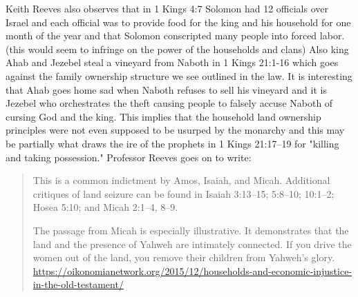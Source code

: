 \documentclass[11pt]{article}
\begin{document}
{Keith Reeves also observes that in 1 Kings 4:7 Solomon had 12 officials over Israel and each official was to provide food for the king and his household for one month of the year and that Solomon conscripted many people into forced labor. (this would seem to infringe on the power of the households and clans) Also king Ahab and Jezebel steal a vineyard from Naboth in 1 Kings 21:1-16 which goes against the family ownership structure we see outlined in the law. It is interesting that Ahab goes home sad when Naboth refuses to sell his vineyard and it is Jezebel who orchestrates the theft causing people to falsely accuse Naboth of cursing God and the king. This implies that the household land ownership principles were not even supposed to be usurped by the monarchy and this may be partially what draws the ire of the prophets in 1 Kings 21:17–19 for "killing and taking possession." Professor Reeves goes on to write:
\begin{quote}
This is a common indictment by Amos, Isaiah, and Micah. Additional critiques of land seizure can be found in Isaiah 3:13–15; 5:8–10; 10:1–2; Hosea 5:10; and Micah 2:1–4, 8–9.

The passage from Micah is especially illustrative. It demonstrates that the land and the presence of Yahweh are intimately connected. If you drive the women out of the land, you remove their children from Yahweh’s glory. \url{https://oikonomianetwork.org/2015/12/households-and-economic-injustice-in-the-old-testament/}
\end{quote} 


}
\end{document}
